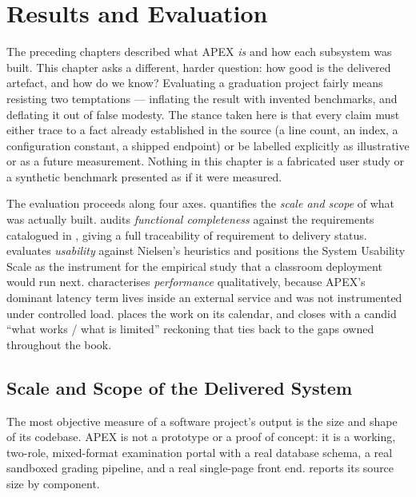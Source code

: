 \chapter{Results and Evaluation}\label{ch:ch11}

The preceding chapters described what APEX \emph{is} and how each subsystem was
built. This chapter asks a different, harder question: how good is the delivered
artefact, and how do we know? Evaluating a graduation project fairly means
resisting two temptations --- inflating the result with invented benchmarks, and
deflating it out of false modesty. The stance taken here is that every claim must
either trace to a fact already established in the source (a line count, an index, a
configuration constant, a shipped endpoint) or be labelled explicitly as
illustrative or as a future measurement. Nothing in this chapter is a fabricated
user study or a synthetic benchmark presented as if it were measured.

The evaluation proceeds along four axes.  quantifies the
\emph{scale and scope} of what was actually built.  audits
\emph{functional completeness} against the requirements catalogued in
, giving a full traceability of requirement to delivery status.
 evaluates \emph{usability} against Nielsen's heuristics and
positions the System Usability Scale as the instrument for the empirical study that a
classroom deployment would run next.  characterises
\emph{performance} qualitatively, because APEX's dominant
latency term lives inside an external service and was not instrumented under
controlled load.  places the work on its calendar, and
 closes with a candid ``what works / what is limited''
reckoning that ties back to the gaps owned throughout the book.

\section{Scale and Scope of the Delivered System}
\label{sec:res-scale}

The most objective measure of a software project's output is the size and shape of
its codebase. APEX is not a prototype or a proof of concept: it is a working,
two-role, mixed-format examination portal with a real database schema, a real
sandboxed grading pipeline, and a real single-page front end. 
reports its source size by component.

